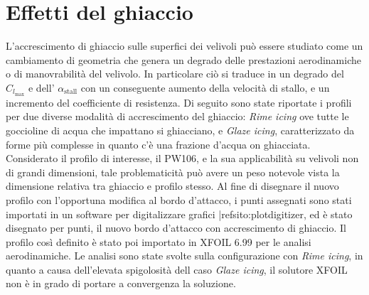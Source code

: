 \chapter{Effetti del ghiaccio}
L'accrescimento di ghiaccio sulle superfici dei velivoli può essere studiato come un cambiamento di geometria che genera un degrado delle prestazioni aerodinamiche o di manovrabilità del velivolo. In particolare ciò si traduce in un degrado del $C_{l_{\mathrm{max}}}$  e dell' ${\alpha}_{\mathrm{stall}}$ con un conseguente aumento della velocità di stallo, e un incremento del coefficiente di resistenza. 
Di seguito sono state riportate i profili per due diverse modalità di accrescimento del ghiaccio: {\itshape Rime icing} ove tutte le goccioline di acqua che impattano si ghiacciano, e {\itshape Glaze icing}, caratterizzato da forme più complesse in quanto c'è una frazione d'acqua on ghiacciata.
Considerato il profilo di interesse, il PW106, e la sua applicabilità su velivoli non di grandi dimensioni, tale problematicità può avere un peso notevole vista la dimensione relativa tra ghiaccio e profilo stesso. 
Al fine di disegnare il nuovo profilo con l'opportuna modifica al bordo d'attacco, i punti assegnati sono stati importati in un software per digitalizzare grafici |ref{sito:plotdigitizer}, ed è stato disegnato per punti, il nuovo bordo d'attacco con accrescimento di ghiaccio. Il profilo così definito è stato poi importato in XFOIL 6.99 per le analisi aerodinamiche. Le analisi sono state svolte sulla configurazione con {\itshape Rime icing}, in quanto a causa dell'elevata spigolosità dell caso  {\itshape Glaze icing}, il solutore XFOIL non è in grado di portare a convergenza la soluzione.


